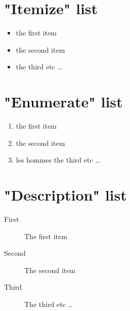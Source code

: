 \documentclass{article}%
\begin{document}
%
\normalsize%
\section{"Itemize" list}%
\label{sec:Itemizelist}%
\begin{itemize}%
\item%
the first item%
\item%
the second item%
\item%
the third etc%
\ldots%
\end{itemize}

%
\section{"Enumerate" list}%
\label{sec:Enumeratelist}%
\begin{enumerate}[label=\alph*),start=20]%
\item%
the first item%
\item%
the second item%
\item%
 les hommes the third etc \ldots%
\end{enumerate}

%
\section{"Description" list}%
\label{sec:Descriptionlist}%
\begin{description}%
\item[First]%
The first item%
\item[Second]%
The second item%
\item[Third]%
The third etc \ldots%
\end{description}

%
\end{document}
